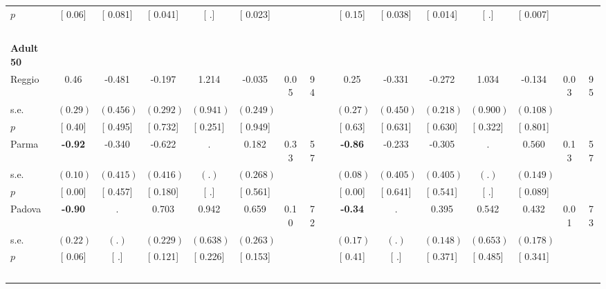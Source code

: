 \begin{longtable}{L{8em} c c c c c c c p{1em} c c c c c c c}
\quad \quad \quad \quad $ p$ & [     0.06] & [    0.081] & [    0.041] & [        .] & [    0.023] & & & & [     0.15] & [    0.038] & [    0.014] & [        .] & [    0.007] & &  \\[1em]
~\\[1em]
\quad \quad \textbf{Adult 50} & & & & & & & & & & & & & & & \\* 
\quad \quad \quad Reggio& 0.46 &    -0.481 &    -0.197 &     1.214 &    -0.035 &      0.05 &        94 & & 0.25 &    -0.331 &    -0.272 &     1.034 &    -0.134 &      0.03 &        95  \\*
\quad \quad \quad \quad s.e.& $ (     0.29)$ & $ (    0.456)$ & $ (    0.292)$ & $ (    0.941)$ & $ (    0.249)$ & & & & $ (     0.27)$ & $ (    0.450)$ & $ (    0.218)$ & $ (    0.900)$ & $ (    0.108)$ & &  \\*
\quad \quad \quad \quad $ p$ & [     0.40] & [    0.495] & [    0.732] & [    0.251] & [    0.949] & & & & [     0.63] & [    0.631] & [    0.630] & [    0.322] & [    0.801] & &  \\[1em]
\quad \quad \quad Parma& \textbf{    -0.92} &    -0.340 &    -0.622 &         . &     0.182 &      0.33 &        57 & & \textbf{    -0.86} &    -0.233 &    -0.305 &         . & $ \mathbf{    0.560}$ &      0.13 &        57  \\*
\quad \quad \quad \quad s.e.& $ (     0.10)$ & $ (    0.415)$ & $ (    0.416)$ & $ (        .)$ & $ (    0.268)$ & & & & $ (     0.08)$ & $ (    0.405)$ & $ (    0.405)$ & $ (        .)$ & $ (    0.149)$ & &  \\*
\quad \quad \quad \quad $ p$ & [     0.00] & [    0.457] & [    0.180] & [        .] & [    0.561] & & & & [     0.00] & [    0.641] & [    0.541] & [        .] & [    0.089] & &  \\[1em]
\quad \quad \quad Padova& \textbf{    -0.90} &         . &     0.703 &     0.942 &     0.659 &      0.10 &        72 & & \textbf{    -0.34} &         . &     0.395 &     0.542 &     0.432 &      0.01 &        73  \\*
\quad \quad \quad \quad s.e.& $ (     0.22)$ & $ (        .)$ & $ (    0.229)$ & $ (    0.638)$ & $ (    0.263)$ & & & & $ (     0.17)$ & $ (        .)$ & $ (    0.148)$ & $ (    0.653)$ & $ (    0.178)$ & &  \\*
\quad \quad \quad \quad $ p$ & [     0.06] & [        .] & [    0.121] & [    0.226] & [    0.153] & & & & [     0.41] & [        .] & [    0.371] & [    0.485] & [    0.341] & &  \\[1em]
~\\[1em]

\end{longtable}
